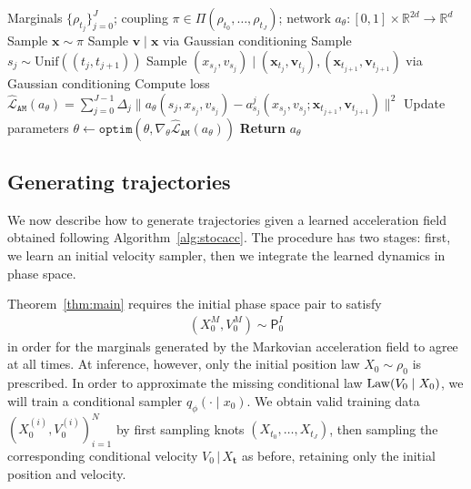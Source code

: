 \documentclass[12pt]{article}
\theoremstyle{plain}
\theoremstyle{plain}
\theoremstyle{remark}
\newcommand{\msf}[1]{\mathsf{#1}}
\newcommand{\1}{\bm{1}}
\theoremstyle{plain}
\theoremstyle{definition}
\theoremstyle{remark}
\begin{document}
\begin{algorithm}[t]
\caption{Training algorithm for Acceleration Matching}
\label{alg:stocacc}
\begin{algorithmic}[1]
\REQUIRE Marginals $\{\rho_{t_j}\}_{j=0}^J$; coupling $\pi \in \Pi(\rho_{t_0},\ldots,\rho_{t_J})$; network
$a_\theta : [0,1]\times \mathbb{R}^{2d} \to \mathbb{R}^d$
    \STATE Sample $\bm{x} \sim \pi$
    \STATE Sample $\bm v \mid \bm x$ via Gaussian conditioning
    \STATE Sample $s_j \sim \mathrm{Unif}((t_j,t_{j+1}))$
    \STATE Sample $(x_{s_j},v_{s_j}) \mid (\bm x_{t_j},\bm v_{t_j}),(\bm x_{t_{j+1}},\bm v_{t_{j+1}})$ via Gaussian conditioning
    \ENDFOR
    \STATE Compute loss $\widehat{\mathcal{L}}_{\mathtt{AM}}(a_\theta) = \sum_{j=0}^{J-1}{\Delta_j}\|a_\theta(s_j,x_{s_j},v_{s_j}) - a_{s_j}^j(x_{s_j},v_{s_j}; \bm x_{t_{j+1}}, \bm v_{t_{j+1}})\|^2$
    \STATE Update parameters $\theta \gets \texttt{optim}(\theta, \nabla_\theta
    \widehat{\mathcal{L}}_{\mathtt{AM}}(a_\theta))$
\ENDWHILE
\STATE \textbf{Return} $a_\theta$
\end{algorithmic}
\end{algorithm}








\subsection{Generating trajectories}\label{sec:gen_trajec}
We now describe how to generate trajectories given a learned acceleration field obtained following Algorithm~\ref{alg:stocacc}. The procedure has two stages: first, we learn an initial velocity sampler, then we integrate the learned dynamics in phase space.

Theorem~\ref{thm:main} requires the initial phase space pair to satisfy
\begin{align*}
      (X_0^M,V_0^M) \sim \msf P_0^I
\end{align*}
in order for the marginals generated by the Markovian acceleration field to agree at all times. At inference, however, only the initial position law $X_0\sim\rho_0$ is prescribed. In order to approximate the missing conditional law ${\rm Law}(V_0\mid X_0)$, we will train a conditional sampler $q_\phi(\cdot\mid x_0)$. We obtain valid training data $(X_0^{(i)},V_0^{(i)})_{i=1}^N$ by first sampling knots $(X_{t_0},\ldots,X_{t_J})$, then sampling the corresponding conditional velocity $V_0\,|\, X_{\bm t}$ as before, retaining only the initial position and velocity.
\end{document}
